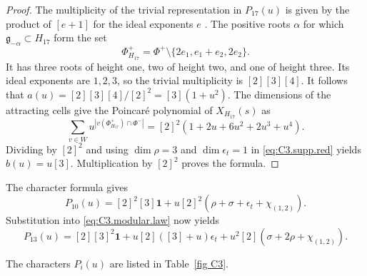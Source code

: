 \documentclass[11pt]{amsart}
\numberwithin{equation}{section}
\theoremstyle{definition}
\begin{document}
\begin{proof}
The multiplicity of the trivial representation in $P_{17}(u)$ is given by the product of $[e+1]$ for the ideal exponents $e$ \cite{ST,AHMMS}.
The positive roots $\alpha$ for which $\mathfrak g_{-\alpha}\subset H_{17}$ form the set
\[
\Phi^+_{H_{17}}
=\Phi^+\setminus\{2e_1,e_1+e_2,2e_2\}.
\]
It has three roots of height one, two of height two, and one of height three.
Its ideal exponents are $1,2,3$, so the trivial multiplicity is $[2][3][4]$.
It follows that
$a(u)=[2][3][4]/[2]^2=[3](1+u^2)$.
The dimensions of the attracting cells give the Poincar\'e polynomial of $X_{H_{17}}(s)$ as
\[
\sum_{v\in W}u^{|v(\Phi^+_{H_{17}})\cap\Phi^-|}
=[2]^2(1+2u+6u^2+2u^3+u^4).
\]
Dividing by $[2]^2$ and using $\dim\rho=3$ and $\dim\epsilon_t=1$ in
\eqref{eq:C3.supp.red} yields $b(u)=u[3]$.
Multiplication by $[2]^2$ proves the formula.
\end{proof}

The character formula gives
\[
P_{10}(u)=[2]^2[3]\mathbf1
 +u[2]^2(\rho+\sigma+\epsilon_t+\chi_{(1,2)}).
\]
Substitution into \eqref{eq:C3.modular.law} now yields
\[
P_{13}(u)=[2][3]^2\mathbf1+u[2]([3]+u)\epsilon_t+u^2[2](\sigma+2\rho+\chi_{(1,2)}).
\]

The characters $P_i(u)$ are listed in Table~\ref{fig C3}.
\end{document}
